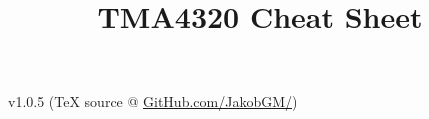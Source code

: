 \documentclass[6pt]{article}
\date{}
\title{TMA4320 Cheat Sheet}
\theoremstyle{definition}
\begin{document}
\begin{multicols*}{3}

\maketitle
v1.0.5 (TeX source @ \href{https://github.com/JakobGM/Numerical-Analysis-Cheat-Sheet}{GitHub.com/JakobGM/})






\end{multicols*}
\end{document}
